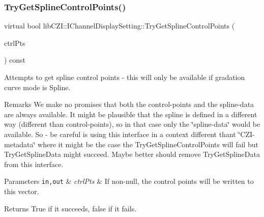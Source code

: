\subsubsection{\texorpdfstring{Try\+Get\+Spline\+Control\+Points()}{TryGetSplineControlPoints()}}
{\footnotesize\ttfamily virtual bool lib\+C\+Z\+I\+::\+I\+Channel\+Display\+Setting\+::\+Try\+Get\+Spline\+Control\+Points (\begin{DoxyParamCaption}\item[{std\+::vector$<$ \hyperlink{structlib_c_z_i_1_1_i_display_settings_1_1_spline_control_point}{lib\+C\+Z\+I\+::\+I\+Display\+Settings\+::\+Spline\+Control\+Point} $>$ $\ast$}]{ctrl\+Pts }\end{DoxyParamCaption}) const\hspace{0.3cm}{\ttfamily [pure virtual]}}

Attempts to get spline control points -\/ this will only be available if gradation curve mode is {\ttfamily Spline}. \begin{DoxyRemark}{Remarks}
We make no promises that both the control-\/points and the spline-\/data are always available. It might be plausible that the spline is defined in a different way (different than control-\/points), so in that case only the \char`\"{}spline-\/data\char`\"{} would be available. So -\/ be careful is using this interface in a context different thant \char`\"{}\+C\+Z\+I-\/metadata\char`\"{} where it might be the case the \textquotesingle{}Try\+Get\+Spline\+Control\+Points\textquotesingle{} will fail but \textquotesingle{}Try\+Get\+Spline\+Data\textquotesingle{} might succeed. Maybe better should remove \textquotesingle{}Try\+Get\+Spline\+Data\textquotesingle{} from this interface.
\end{DoxyRemark}

\begin{DoxyParams}[1]{Parameters}
\mbox{\tt in,out}  & {\em ctrl\+Pts} & If non-\/null, the control points will be written to this vector.\\
\hline
\end{DoxyParams}
\begin{DoxyReturn}{Returns}
True if it succeeds, false if it fails. 
\end{DoxyReturn}
\mbox{\label{classlib_c_z_i_1_1_i_channel_display_setting_ae3779bf0fb5b48c8ee3549e2ebb3947f}} 
